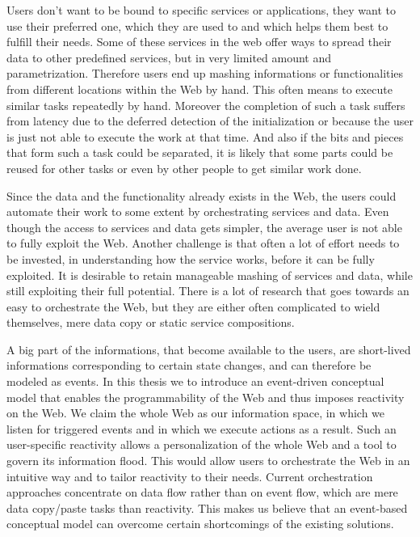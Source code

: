 Users don't want to be bound to specific services or applications, they want to use their preferred one, which they are used to and which helps them best to fulfill their needs.
Some of these services in the web offer ways to spread their data to other predefined services, but in very limited amount and parametrization.
Therefore users end up mashing informations or functionalities from different locations within the Web by hand.
This often means to execute similar tasks repeatedly by hand.
Moreover the completion of such a task suffers from latency due to the deferred detection of the initialization or because the user is just not able to execute the work at that time.
And also if the bits and pieces that form such a task could be separated, it is likely that some parts could be reused for other tasks or even by other people to get similar work done.

Since the data and the functionality already exists in the Web, the users could automate their work to some extent by orchestrating services and data.
Even though the access to services and data gets simpler, the average user is not able to fully exploit the Web.
Another challenge is that often a lot of effort needs to be invested, in understanding how the service works, before it can be fully exploited.
It is desirable to retain manageable mashing of services and data, while still exploiting their full potential.
There is a lot of research that goes towards an easy to orchestrate the Web, but they are either often complicated to wield themselves, mere data copy or static service compositions.

A big part of the informations, that become available to the users, are short-lived informations corresponding to certain state changes, and can therefore be modeled as events.
In this thesis we to introduce an event-driven conceptual model that enables the programmability of the Web and thus imposes reactivity on the Web.
We claim the whole Web as our information space, in which we listen for triggered events and in which we execute actions as a result.
Such an user-specific reactivity allows a personalization of the whole Web and a tool to govern its information flood.
This would allow users to orchestrate the Web in an intuitive way and to tailor reactivity to their needs.
Current orchestration approaches concentrate on data flow rather than on event flow, which are mere data copy/paste tasks than reactivity.
This makes us believe that an event-based conceptual model can overcome certain shortcomings of the existing solutions.


